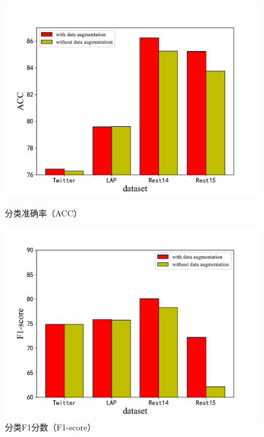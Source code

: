 \begin{figure}[htb]
    \begin{minipage}[t]{0.5\linewidth}
    \centering
    \includegraphics[width=1\textwidth]{pic/DAACC.pdf}
    \caption{分类准确率（ACC）}
    \label{DAACC}
    \end{minipage}
    \quad
    \begin{minipage}[t]{0.5\linewidth}
    \centering
    \includegraphics[width=1\textwidth]{pic/DAF1.pdf}
    \caption{分类F1分数（F1-score）}
    \label{DAF1}
    \end{minipage}
\end{figure}

